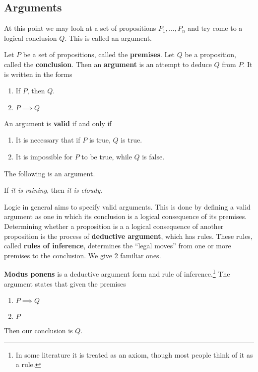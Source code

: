 \documentclass{article}
\begin{document}
  \subsection{Arguments}

    At this point we may look at a set of propositions $P_1, \ldots, P_n$ and try come to a logical conclusion $Q$. This is called an argument. 

    \begin{definition}[Argument]
      Let $P$ be a set of propositions, called the \textbf{premises}. Let $Q$ be a proposition, called the \textbf{conclusion}. Then an \textbf{argument} is an attempt to deduce $Q$ from $P$. It is written in the forms 
      \begin{enumerate}
        \item If $P$, then $Q$.  
        \item $P \implies Q$
      \end{enumerate}
      An argument is \textbf{valid} if and only if  
      \begin{enumerate}
        \item It is necessary that if $P$ is true, $Q$ is true. 
        \item It is impossible for $P$ to be true, while $Q$ is false. 
      \end{enumerate}
    \end{definition}

    \begin{example}
      The following is an argument. 
      \begin{center} 
        If \textit{it is raining}, then \textit{it is cloudy}. 
      \end{center} 
    \end{example} 

    Logic in general aims to specify valid arguments. This is done by defining a valid argument as one in which its conclusion is a logical consequence of its premises. Determining whether a proposition is a a logical consequence of another proposition is the process of \textbf{deductive argument}, which has rules. These rules, called \textbf{rules of inference}, determines the ``legal moves'' from one or more premises to the conclusion. We give 2 familiar ones. 

    \begin{definition}
      \textbf{Modus ponens} is a deductive argument form and rule of inference.\footnote{In some literature it is treated as an axiom, though most people think of it as a rule.} The argument states that given the premises
      \begin{enumerate}
        \item $P \implies Q$ 
        \item $P$
      \end{enumerate}
      Then our conclusion is $Q$. 
    \end{definition} 
\end{document}
